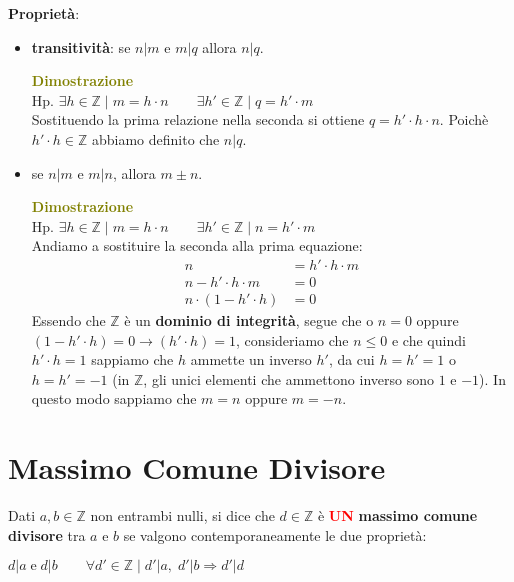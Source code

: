 \textbf{Proprietà}:
\begin{itemize}[nosep]
    \item \textbf{transitività}: se $n|m$ e $m|q$ allora $n|q$.
    \begin{boxA}
        \textcolor{olive}{\textbf{Dimostrazione}} \\
        Hp. $\exists h \in \mathbb{Z} \; | \; m = h \cdot n \qquad \exists h' \in \mathbb{Z} \; | \; q = h' \cdot m$ \\
        Sostituendo la prima relazione nella seconda si ottiene $q = h' \cdot h \cdot n$. Poichè $h' \cdot h \in \mathbb{Z}$ abbiamo definito che $n|q$.
    \end{boxA}

    \item se $n|m$ e $m|n$, allora $m \pm n$.
    \begin{boxA}
        \textcolor{olive}{\textbf{Dimostrazione}} \\
        Hp. $\exists h \in \mathbb{Z} \; | \; m = h \cdot n \qquad \exists h' \in \mathbb{Z} \; | \; n = h' \cdot m$ \\
        Andiamo a sostituire la seconda alla prima equazione:
        \begin{align*}
            n &= h' \cdot h \cdot m \\
            n - h' \cdot h \cdot m &= 0 \\
            n \cdot (1 - h' \cdot h) &= 0
        \end{align*}
        Essendo che $\mathbb{Z}$ è un \textbf{dominio di integrità}, segue che o $n = 0$ oppure $(1 - h' \cdot h) = 0 \rightarrow (h' \cdot h) = 1$, consideriamo che $n \leq 0$ e che quindi $h' \cdot h = 1$ sappiamo che $h$ ammette un inverso $h'$, da cui $h = h' = 1$ o $h = h' = -1$ (in $\mathbb{Z}$, gli unici elementi che ammettono inverso sono $1$ e $-1$). In questo modo sappiamo che $m=n$ oppure $m=-n$.
    \end{boxA}
\end{itemize}

\newpage
\section{Massimo Comune Divisore}
Dati $a,b \in \mathbb{Z}$ non entrambi nulli, si dice che $d \in \mathbb{Z}$ è \textcolor{red}{\textbf{UN}} \textbf{massimo comune divisore} tra $a$ e $b$ se valgono contemporaneamente le due proprietà:
\begin{center}
    $d|a \; \text{e} \; d|b \qquad \forall d' \in \mathbb{Z} \; | \; d'|a, \; d'|b \Rightarrow d'|d$
\end{center}

